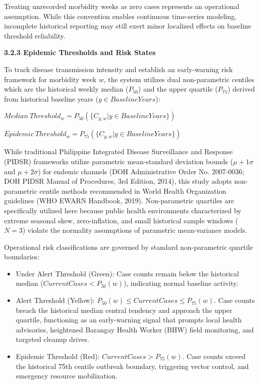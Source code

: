 \documentclass[
]{article}
\begin{document}
Treating unrecorded morbidity weeks as zero cases represents an
operational assumption. While this convention enables continuous
time-series modeling, incomplete historical reporting may still exert
minor localized effects on baseline threshold reliability.

\textbf{3.2.3 Epidemic Thresholds and Risk States}

To track disease transmission intensity and establish an early-warning
risk framework for morbidity week \(w\), the system utilizes dual
non-parametric centiles which are the historical weekly median
(\(P_{50}\)) and the upper quartile (\(P_{75}\)) derived from historical
baseline years (\(y \in BaselineYears\)):

\(Median\ Threshold_{w} = P_{50}(\{ C_{y,w}|y \in BaselineYears\})\)

\(Epidemic\ Threshold_{w} = P_{75}(\{ C_{y,w}|y \in BaselineYears\})\)

While traditional Philippine Integrated Disease Surveillance and
Response (PIDSR) frameworks utilize parametric mean-standard deviation
bounds (\(\mu + 1\sigma\) and \(\mu + 2\sigma\)) for endemic channels
(DOH Administrative Order No. 2007-0036; DOH PIDSR Manual of Procedures,
3rd Edition, 2014), this study adopts non-parametric centile methods
recommended in World Health Organization guidelines (WHO EWARN Handbook,
2019). Non-parametric quartiles are specifically utilized here because
public health environments characterized by extreme seasonal skew,
zero-inflation, and small historical sample windows (\(N = 3\)) violate
the normality assumptions of parametric mean-variance models.

Operational risk classifications are governed by standard non-parametric
quartile boundaries:

\begin{itemize}
\item
  Under Alert Threshold (Green): Case counts remain below the historical
  median (\(CurrentCases < P_{50}(w)\)), indicating normal baseline
  activity.
\item
  Alert Threshold (Yellow):
  \(P_{50}(w) \leq CurrentCases \leq P_{75}(w)\). Case counts breach the
  historical median central tendency and approach the upper quartile,
  functioning as an early-warning signal that prompts local health
  advisories, heightened Barangay Health Worker (BHW) field monitoring,
  and targeted cleanup drives.
\item
  Epidemic Threshold (Red): \(CurrentCases > P_{75}(w)\). Case counts
  exceed the historical 75th centile outbreak boundary, triggering
  vector control, and emergency resource mobilization.
\end{itemize}
\end{document}
